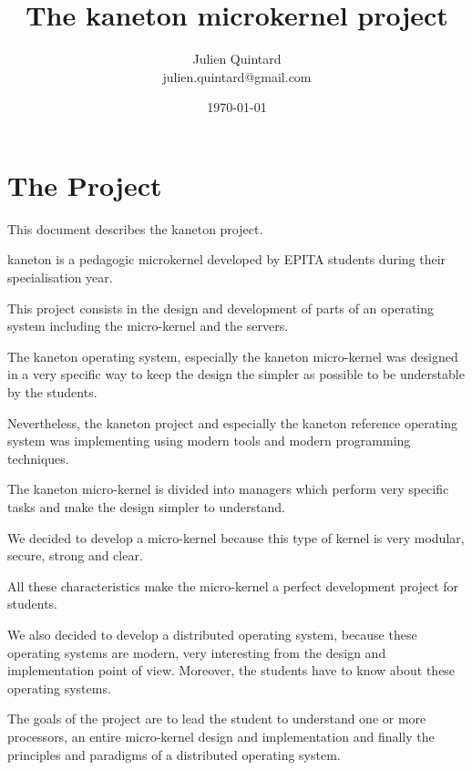 \documentclass[10pt,a4wide]{article}
\title{The kaneton microkernel project}
\author{\small{Julien Quintard} \\
        \scriptsize{julien.quintard@gmail.com}}
\date{\scriptsize{\today}}
\begin{document}
\maketitle


\begin{abstract}

\end{abstract}

%
%



\section{The Project}

This document describes the kaneton project.

kaneton is a pedagogic microkernel developed by EPITA students during
their specialisation year.

This project consists in the design and development of parts of an
operating system including the micro-kernel and the servers.

The kaneton operating system, especially the kaneton micro-kernel was
designed in a very specific way to keep the design the simpler as possible
to be understable by the students.

Nevertheless, the kaneton project and especially the kaneton reference
operating system was implementing using modern tools and modern
programming techniques.

The kaneton micro-kernel is divided into managers which perform very
specific tasks and make the design simpler to understand.

We decided to develop a micro-kernel because this type of kernel is very
modular, secure, strong and clear.

All these characteristics make the micro-kernel a perfect development
project for students.

We also decided to develop a distributed operating system, because these
operating systems are modern, very interesting from the design and
implementation point of view. Moreover, the students have to know about
these operating systems.

The goals of the project are to lead the student to understand one or more
processors, an entire micro-kernel design and implementation and finally
the principles and paradigms of a distributed operating system.
\end{document}
